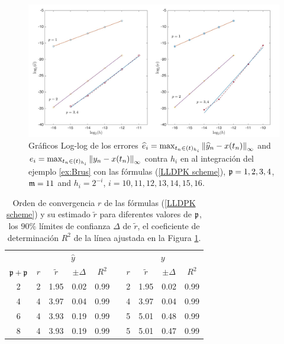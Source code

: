 \begin{figure}[h]
	\begin{center}
		\includegraphics[scale=0.45]{Graphics/lldp/p-plots.jpg}
		\caption{Gráficos Log-log de los errores $\widehat{e}_i=\max_{t_n\in(t)_{h_i}}\left\lVert \widehat{y}_n-x(t_n) \right\rVert_\infty$ and $e_i=\max_{t_n\in(t)_{h_i}}\left\lVert y_n-x(t_n) \right\rVert_\infty$ contra $h_i$ en al integración del ejemplo \ref{ex:Brus} con las fórmulas (\ref{LLDPK scheme}), $\mathfrak{p}=1,2,3,4$, $\mathfrak{m}=11$ and $h_i=2^{-i}$, $i=10,11,12,13,14,15,16$.}
		\label{fig:num-exp-lldp-fix-step:Fig2}
	\end{center}
\end{figure}


\begin{table}[h]
	\centering
	\caption{
		Orden de convergencia $r$ de las fórmulas (\ref{LLDPK scheme}) y su estimado  $\widetilde{r}$ para diferentes valores de $\mathfrak{p}$, los $90\%$ límites de confianza $\Delta$ de $\widetilde {r}$, el coeficiente de determinación $R^2$ de la línea ajustada en la Figura \ref{fig:num-exp-lldp-fix-step:Fig2}.\newline }
		\begin{tabular}{ c  c c c c  c  c c c c}
			\hline
			& \multicolumn{4}{c}{$\widehat{y}$} & & \multicolumn{4}{c}{$y$} \\
			\cline{2-5} \cline{7-10}
			$\mathfrak{p}+\mathfrak{p}$ & $r$ & $\widetilde{r}$ & $\pm\varDelta$ & $R^2$ & & $r$ & $\widetilde{r}$ & $\pm\varDelta$ & $R^2$ \\
			\hline
			2 & 2 & 1.95 & 0.02 & 0.99 & & 2 & 1.95 & 0.02 & 0.99 \\
			4 & 4 & 3.97 & 0.04 & 0.99 & & 4 & 3.97 & 0.04 & 0.99 \\
			6 & 4 & 3.93 & 0.19 & 0.99 & & 5 & 5.01 & 0.48 & 0.99 \\
			8 & 4 & 3.93 & 0.19 & 0.99 & & 5 & 5.01 & 0.47 & 0.99 \\
			\hline
		\end{tabular}
	\label{tab:num-exp-lldp-fix-step:porders}
\end{table}

